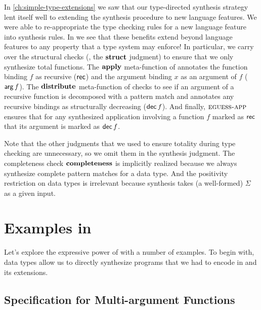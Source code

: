 In \autoref{ch:simple-type-extensions} we saw that our type-directed synthesis strategy lent itself well to extending the synthesis procedure to new language features.
We were able to re-appropriate the type checking rules for a new language feature into synthesis rules.
In \mlsyn{} we see that these benefits extend beyond language features to any property that a type system may enforce!
In particular, we carry over the structural checks (\ie, the $\mathbf{struct}$ judgment) to ensure that we only synthesize total functions.
The $\mathbf{apply}$ meta-function of  annotates the function binding $f$ as recursive ($\mathsf{rec}$) and the argument binding $x$ as an argument of $f$ ($\mathsf{arg}\,f$).
The $\mathbf{distribute}$ meta-function of  checks to see if an argument of a recursive function is decomposed with a pattern match and annotates any recursive bindings as structurally decreasing ($\mathsf{dec}\,f$).
And finally, $\textsc{eguess-app}$ ensures that for any synthesized application involving a function $f$ marked as $\mathsf{rec}$ that its argument is marked as $\mathsf{dec}\,f$.

Note that the other judgments that we used to ensure totality during type checking are unnecessary, so we omit them in the synthesis judgment.
The completeness check $\mathbf{completeness}$ is implicitly realized because we always synthesize complete pattern matches for a data type.
And the positivity restriction on data types is irrelevant because synthesis takes (a well-formed) $Σ$ as a given input.

\section{Examples in \texorpdfstring{\mlsyn{}}{MLsyn}}
\label{sec:examples-in-mlsyn}

Let's explore the expressive power of \mlsyn{} with a number of examples.
To begin with, data types allow us to directly synthesize programs that we had to encode in \lsyn{} and its extensions.

\subsection{Specification for Multi-argument Functions}

